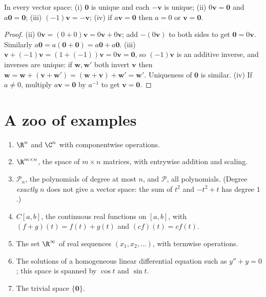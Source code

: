 \begin{proposition}\label{prop:vsbasic}
In every vector space: (i) $\mathbf{0}$ is unique and each $-\mathbf{v}$ is unique; (ii) $0\mathbf{v}=\mathbf{0}$ and $a\mathbf{0}=\mathbf{0}$; (iii) $(-1)\mathbf{v}=-\mathbf{v}$; (iv) if $a\mathbf{v}=\mathbf{0}$ then $a=0$ or $\mathbf{v}=\mathbf{0}$.
\end{proposition}

\begin{proof}
(ii) $0\mathbf{v}=(0+0)\mathbf{v}=0\mathbf{v}+0\mathbf{v}$; add $-(0\mathbf{v})$ to both sides to get $\mathbf{0}=0\mathbf{v}$. Similarly $a\mathbf{0}=a(\mathbf{0}+\mathbf{0})=a\mathbf{0}+a\mathbf{0}$. (iii) $\mathbf{v}+(-1)\mathbf{v}=(1+(-1))\mathbf{v}=0\mathbf{v}=\mathbf{0}$, so $(-1)\mathbf{v}$ is an additive inverse, and inverses are unique: if $\mathbf{w},\mathbf{w}'$ both invert $\mathbf{v}$ then $\mathbf{w}=\mathbf{w}+(\mathbf{v}+\mathbf{w}')=(\mathbf{w}+\mathbf{v})+\mathbf{w}'=\mathbf{w}'$. Uniqueness of $\mathbf{0}$ is similar. (iv) If $a\ne0$, multiply $a\mathbf{v}=\mathbf{0}$ by $a^{-1}$ to get $\mathbf{v}=\mathbf{0}$.
\end{proof}

\section{A zoo of examples}

\begin{example}\label{ex:spaces}
\begin{enumerate}[label=(\alph*)]
  \item $\R^n$ and $\C^n$ with componentwise operations.
  \item $\R^{m\times n}$, the space of $m\times n$ matrices, with entrywise addition and scaling.
  \item $\mathcal{P}_n$, the polynomials of degree at most $n$, and $\mathcal{P}$, all polynomials. (Degree \emph{exactly} $n$ does not give a vector space: the sum of $t^2$ and $-t^2+t$ has degree $1$.)
  \item $C[a,b]$, the continuous real functions on $[a,b]$, with $(f+g)(t)=f(t)+g(t)$ and $(cf)(t)=cf(t)$.
  \item The set $\R^\infty$ of real sequences $(x_1,x_2,\dots)$, with termwise operations.
  \item The solutions of a homogeneous linear differential equation such as $y''+y=0$; this space is spanned by $\cos t$ and $\sin t$.
  \item The trivial space $\{\mathbf{0}\}$.
\end{enumerate}
\end{example}

